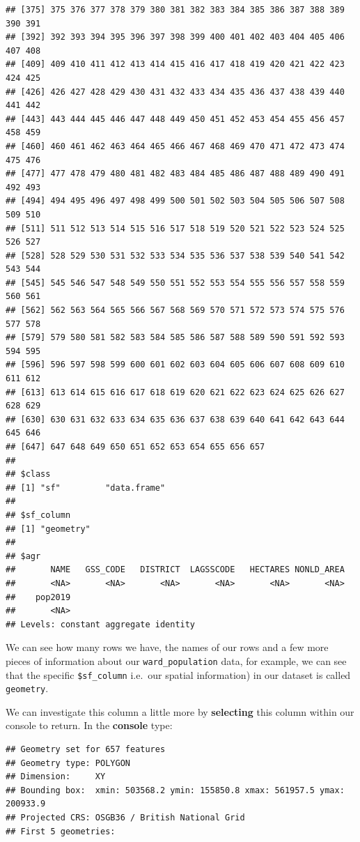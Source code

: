 \documentclass[
]{book}
\newenvironment{Shaded}{\begin{snugshade}}{\end{snugshade}}
\newcommand{\CommentTok}[1]{\textcolor[rgb]{0.56,0.35,0.01}{\textit{#1}}}
\newcommand{\NormalTok}[1]{#1}
\newcommand{\SpecialCharTok}[1]{\textcolor[rgb]{0.00,0.00,0.00}{#1}}
\begin{document}
\begin{verbatim}
## [375] 375 376 377 378 379 380 381 382 383 384 385 386 387 388 389 390 391
## [392] 392 393 394 395 396 397 398 399 400 401 402 403 404 405 406 407 408
## [409] 409 410 411 412 413 414 415 416 417 418 419 420 421 422 423 424 425
## [426] 426 427 428 429 430 431 432 433 434 435 436 437 438 439 440 441 442
## [443] 443 444 445 446 447 448 449 450 451 452 453 454 455 456 457 458 459
## [460] 460 461 462 463 464 465 466 467 468 469 470 471 472 473 474 475 476
## [477] 477 478 479 480 481 482 483 484 485 486 487 488 489 490 491 492 493
## [494] 494 495 496 497 498 499 500 501 502 503 504 505 506 507 508 509 510
## [511] 511 512 513 514 515 516 517 518 519 520 521 522 523 524 525 526 527
## [528] 528 529 530 531 532 533 534 535 536 537 538 539 540 541 542 543 544
## [545] 545 546 547 548 549 550 551 552 553 554 555 556 557 558 559 560 561
## [562] 562 563 564 565 566 567 568 569 570 571 572 573 574 575 576 577 578
## [579] 579 580 581 582 583 584 585 586 587 588 589 590 591 592 593 594 595
## [596] 596 597 598 599 600 601 602 603 604 605 606 607 608 609 610 611 612
## [613] 613 614 615 616 617 618 619 620 621 622 623 624 625 626 627 628 629
## [630] 630 631 632 633 634 635 636 637 638 639 640 641 642 643 644 645 646
## [647] 647 648 649 650 651 652 653 654 655 656 657
## 
## $class
## [1] "sf"         "data.frame"
## 
## $sf_column
## [1] "geometry"
## 
## $agr
##       NAME   GSS_CODE   DISTRICT  LAGSSCODE   HECTARES NONLD_AREA 
##       <NA>       <NA>       <NA>       <NA>       <NA>       <NA> 
##    pop2019 
##       <NA> 
## Levels: constant aggregate identity
\end{verbatim}

We can see how many rows we have, the names of our rows and a few more pieces of information about our \texttt{ward\_population} data, for example, we can see that the specific \texttt{\$sf\_column} i.e.~our spatial information) in our dataset is called \texttt{geometry}.

We can investigate this column a little more by \textbf{selecting} this column within our console to return. In the \textbf{console} type:

\begin{Shaded}
\end{Shaded}

\begin{verbatim}
## Geometry set for 657 features 
## Geometry type: POLYGON
## Dimension:     XY
## Bounding box:  xmin: 503568.2 ymin: 155850.8 xmax: 561957.5 ymax: 200933.9
## Projected CRS: OSGB36 / British National Grid
## First 5 geometries:
\end{verbatim}
\end{document}
